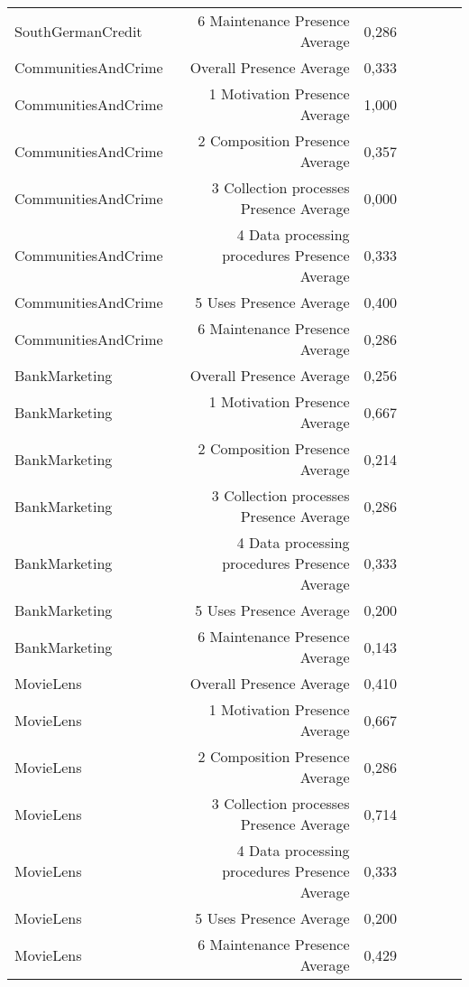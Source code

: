 \begin{table}[t]
\begin{tabular}{|p{2cm}|r|r|r|r|r|r|}
SouthGermanCredit & 6 Maintenance Presence Average & 0,286\cellcolor[HTML]{FCA88D}\\
CommunitiesAndCrime & Overall Presence Average & 0,333\cellcolor[HTML]{FCAB91}\\
CommunitiesAndCrime & 1 Motivation Presence Average & 1,000\cellcolor[HTML]{FEE0D2}\\
CommunitiesAndCrime & 2 Composition Presence Average & 0,357\cellcolor[HTML]{FCAD94}\\
CommunitiesAndCrime & 3 Collection processes Presence Average & 0,000\cellcolor[HTML]{FC9272}\\
CommunitiesAndCrime & 4 Data processing procedures Presence Average & 0,333\cellcolor[HTML]{FCAB91}\\
CommunitiesAndCrime & 5 Uses Presence Average & 0,400\cellcolor[HTML]{FCB198}\\
CommunitiesAndCrime & 6 Maintenance Presence Average & 0,286\cellcolor[HTML]{FCA88D}\\
BankMarketing & Overall Presence Average & 0,256\cellcolor[HTML]{FCA58A}\\
BankMarketing & 1 Motivation Presence Average & 0,667\cellcolor[HTML]{FDC6B2}\\
BankMarketing & 2 Composition Presence Average & 0,214\cellcolor[HTML]{FCA286}\\
BankMarketing & 3 Collection processes Presence Average & 0,286\cellcolor[HTML]{FCA88D}\\
BankMarketing & 4 Data processing procedures Presence Average & 0,333\cellcolor[HTML]{FCAB91}\\
BankMarketing & 5 Uses Presence Average & 0,200\cellcolor[HTML]{FCA185}\\
BankMarketing & 6 Maintenance Presence Average & 0,143\cellcolor[HTML]{FC9D7F}\\
MovieLens & Overall Presence Average & 0,410\cellcolor[HTML]{FCB199}\\
MovieLens & 1 Motivation Presence Average & 0,667\cellcolor[HTML]{FDC6B2}\\
MovieLens & 2 Composition Presence Average & 0,286\cellcolor[HTML]{FCA88D}\\
MovieLens & 3 Collection processes Presence Average & 0,714\cellcolor[HTML]{FDC9B6}\\
MovieLens & 4 Data processing procedures Presence Average & 0,333\cellcolor[HTML]{FCAB91}\\
MovieLens & 5 Uses Presence Average & 0,200\cellcolor[HTML]{FCA185}\\
MovieLens & 6 Maintenance Presence Average & 0,429\cellcolor[HTML]{FCB39B}\\

\end{tabular}
\end{table}
